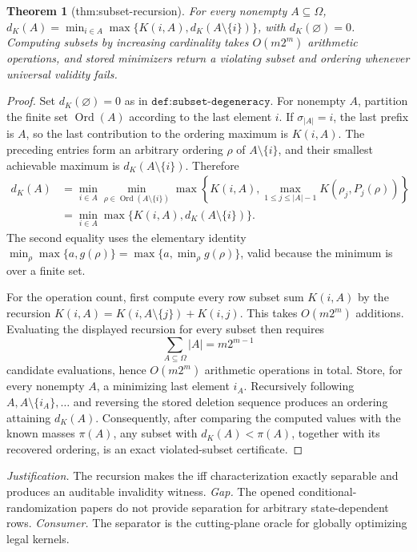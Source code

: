 \documentclass{article}
\newtheorem{theorem}{Theorem}
\begin{document}
\begin{theorem}[thm:subset-recursion]\label{thm:subset-recursion}
For every nonempty \(A\subseteq\Omega\), \(d_K(A)=\min_{i\in A}\max\{K(i,A),d_K(A\setminus\{i\})\}\), with \(d_K(\varnothing)=0\). Computing subsets by increasing cardinality takes \(O(m2^m)\) arithmetic operations, and stored minimizers return a violating subset and ordering whenever universal validity fails.
\end{theorem}
\begin{proof}
Set \(d_K(\varnothing)=0\) as in \(\texttt{def:subset-degeneracy}\).  For nonempty
\(A\), partition the finite set \(\operatorname{Ord}(A)\) according to the last
element \(i\).  If \(\sigma_{|A|}=i\), the last prefix is \(A\), so the last
contribution to the ordering maximum is \(K(i,A)\).  The preceding entries form an
arbitrary ordering \(\rho\) of \(A\setminus\{i\}\), and their smallest achievable
maximum is \(d_K(A\setminus\{i\})\).  Therefore
\[
\begin{aligned}
d_K(A)
&=\min_{i\in A}\min_{\rho\in\operatorname{Ord}(A\setminus\{i\})}
  \max\left\{K(i,A),\max_{1\leq j\leq |A|-1}
  K(\rho_j,P_j(\rho))\right\}\\
&=\min_{i\in A}\max\{K(i,A),d_K(A\setminus\{i\})\}.
\end{aligned}
\]
The second equality uses the elementary identity
\(\min_{\rho}\max\{a,g(\rho)\}=\max\{a,\min_{\rho}g(\rho)\}\), valid because the
minimum is over a finite set.

For the operation count, first compute every row subset sum \(K(i,A)\) by the
recursion \(K(i,A)=K(i,A\setminus\{j\})+K(i,j)\).  This takes
\(O(m2^m)\) additions.  Evaluating the displayed recursion for every subset then
requires
\[
\sum_{A\subseteq\Omega}|A|=m2^{m-1}
\]
candidate evaluations, hence \(O(m2^m)\) arithmetic operations in total.  Store,
for every nonempty \(A\), a minimizing last element \(i_A\).  Recursively following
\(A,A\setminus\{i_A\},\ldots\) and reversing the stored deletion sequence produces
an ordering attaining \(d_K(A)\).  Consequently, after comparing the computed
values with the known masses \(\pi(A)\), any subset with
\(d_K(A)<\pi(A)\), together with its recovered ordering, is an exact violated-subset
certificate.
\end{proof}
\par\smallskip\noindent \textit{Justification.} The recursion makes the iff characterization exactly separable and produces an auditable invalidity witness. \textit{Gap.} The opened conditional-randomization papers do not provide separation for arbitrary state-dependent rows. \textit{Consumer.} The separator is the cutting-plane oracle for globally optimizing legal kernels.
\end{document}
